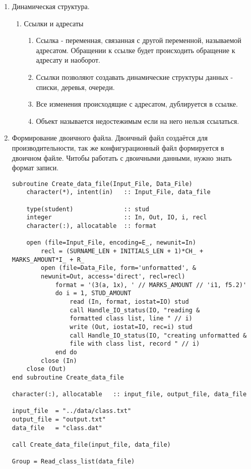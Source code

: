 \documentclass[a4paper,12pt]{extreport}
\begin{document}
\begin{enumerate}
\item Динамическая структура.
    \begin{enumerate}
    \item Ссылки и адресаты
        \begin{enumerate}
            \item Ссылка - переменная, связанная с другой переменной, называемой адресатом. Обращении к ссылке будет происходить обращение к адресату и наоборот.
            \item Ссылки позволяют создавать динамические структуры данных - списки, деревья, очереди.
            \item Все изменения происходящие с адресатом, дублируется в ссылке.
            \item Объект называется недостежимым если на него нельзя ссылаться.
        \end{enumerate}
    \end{enumerate}
    \item Формирование двоичного файла. Двоичный файл создаётся для производительности, так же конфигурационный файл формируется в двоичном файле. Читобы работать с двоичными данными, нужно знать формат записи.
\begin{verbatim}
subroutine Create_data_file(Input_File, Data_File)
    character(*), intent(in)   :: Input_File, data_file
  
    type(student)              :: stud
    integer                    :: In, Out, IO, i, recl
    character(:), allocatable  :: format
  
    open (file=Input_File, encoding=E_, newunit=In)
        recl = (SURNAME_LEN + INITIALS_LEN + 1)*CH_ + MARKS_AMOUNT*I_ + R_
        open (file=Data_File, form='unformatted', &
        newunit=Out, access='direct', recl=recl)
            format = '(3(a, 1x), ' // MARKS_AMOUNT // 'i1, f5.2)'
            do i = 1, STUD_AMOUNT
                read (In, format, iostat=IO) stud
                call Handle_IO_status(IO, "reading &
                formatted class list, line " // i)
                write (Out, iostat=IO, rec=i) stud
                call Handle_IO_status(IO, "creating unformatted &
                file with class list, record " // i)
            end do
        close (In)
    close (Out)
end subroutine Create_data_file

character(:), allocatable   :: input_file, output_file, data_file

input_file  = "../data/class.txt"
output_file = "output.txt"
data_file   = "class.dat"
   
call Create_data_file(input_file, data_file)

Group = Read_class_list(data_file)
\end{verbatim}
\end{enumerate}
\end{document}
